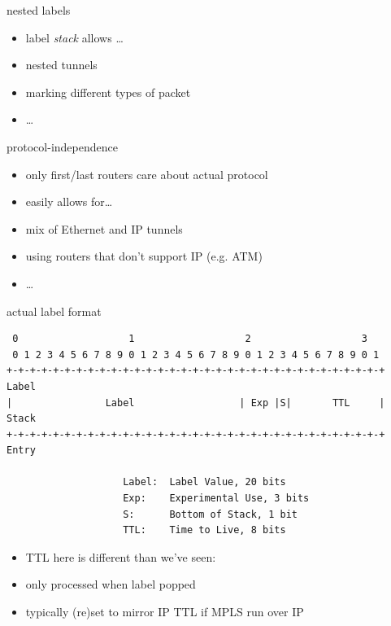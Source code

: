 \begin{frame}{nested labels}
    \begin{itemize}
    \item label \textit{stack} allows \ldots
    \item nested tunnels
    \item marking different types of packet
    \item \ldots
    \end{itemize}
\end{frame}

\begin{frame}{protocol-independence}
    \begin{itemize}
    \item only first/last routers care about actual protocol
    \item easily allows for\ldots
    \vspace{.5cm}
    \item mix of Ethernet and IP tunnels
    \item using routers that don't support IP (e.g. ATM)
    \item \ldots
    \end{itemize}
\end{frame}

\begin{frame}[fragile]{actual label format}
\begin{Verbatim}
 0                   1                   2                   3
 0 1 2 3 4 5 6 7 8 9 0 1 2 3 4 5 6 7 8 9 0 1 2 3 4 5 6 7 8 9 0 1
+-+-+-+-+-+-+-+-+-+-+-+-+-+-+-+-+-+-+-+-+-+-+-+-+-+-+-+-+-+-+-+-+ Label
|                Label                  | Exp |S|       TTL     | Stack
+-+-+-+-+-+-+-+-+-+-+-+-+-+-+-+-+-+-+-+-+-+-+-+-+-+-+-+-+-+-+-+-+ Entry

                    Label:  Label Value, 20 bits
                    Exp:    Experimental Use, 3 bits
                    S:      Bottom of Stack, 1 bit
                    TTL:    Time to Live, 8 bits
\end{Verbatim}
\begin{itemize}
\item TTL here is different than we've seen:
\item only processed when label popped
\item typically (re)set to mirror IP TTL if MPLS run over IP
\end{itemize}
\end{frame}


